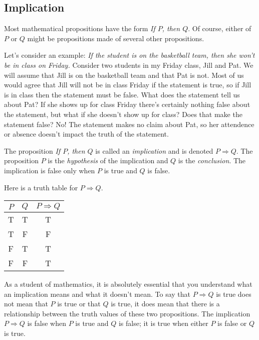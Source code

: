 \subsection{Implication} 

Most mathematical propositions have the form \emph{If $P$, then $Q$}. Of course, either of $P$ or $Q$ might be propositions made of several other propositions.  

Let's consider an example:
\smallbreak\noindent
\emph{If the student is on the basketball team, then she won't be in class on Friday.}
\smallbreak\noindent
Consider two students in my Friday class, Jill and Pat. We will assume that Jill is on the basketball team and that Pat is not. Most of us would agree that Jill will not be in class Friday if the statement is true, so if Jill is in class then the statement must be false. What does the statement tell us about Pat? If she shows up for class Friday there's certainly nothing false about the statement, but what if she doesn't show up for class? Does that make the statement false? No! The statement makes no claim about Pat, so her attendence or absence doesn't impact the truth of the statement. 

\begin{definition}
The proposition \emph{If $P$, then $Q$} is called an \emph{implication}  and is denoted $P\Rightarrow Q$. The proposition $P$ is the \emph{hypothesis}  of the implication and $Q$ is the \emph{conclusion}. The implication is false only when $P$ is true and $Q$ is false.
\end{definition}

Here is a truth table for $P\Rightarrow Q$.

\begin{center}
\begin{tabular}[t]{|c|c|c|}
\hline
$P$ & $Q$ & $P\Rightarrow Q$ \\
\hline
\hline
T & T & T \\
\hline
T & F & F \\
\hline
F & T & T\\
\hline
F & F & T\\
\hline
\end{tabular}
\end{center}

\medbreak
As a student of mathematics, it is absolutely essential that you understand what an implication means and what it doesn't mean.  To say that $P\Rightarrow Q$ is true does not mean that $P$ is true or that $Q$ is true, it does mean that there is a relationship between the truth values of these two propositions.  The implication $P\Rightarrow Q$ is false when $P$ is true and $Q$ is false; it is true when either $P$ is false or $Q$ is true. 

